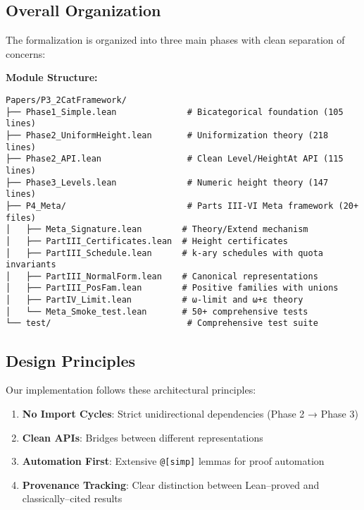 \documentclass[11pt]{article}
\theoremstyle{definition}
\theoremstyle{remark}
\begin{document}
\subsection{Overall Organization}

The formalization is organized into three main phases with clean separation of concerns:

\begin{mdframed}[style=technical]
\textbf{Module Structure:}
\begin{lstlisting}[language={}]
Papers/P3_2CatFramework/
├── Phase1_Simple.lean              # Bicategorical foundation (105 lines)
├── Phase2_UniformHeight.lean       # Uniformization theory (218 lines)
├── Phase2_API.lean                 # Clean Level/HeightAt API (115 lines)
├── Phase3_Levels.lean              # Numeric height theory (147 lines)
├── P4_Meta/                        # Parts III-VI Meta framework (20+ files)
│   ├── Meta_Signature.lean        # Theory/Extend mechanism
│   ├── PartIII_Certificates.lean  # Height certificates
│   ├── PartIII_Schedule.lean      # k-ary schedules with quota invariants
│   ├── PartIII_NormalForm.lean    # Canonical representations
│   ├── PartIII_PosFam.lean        # Positive families with unions
│   ├── PartIV_Limit.lean          # ω-limit and ω+ε theory
│   └── Meta_Smoke_test.lean       # 50+ comprehensive tests
└── test/                           # Comprehensive test suite
\end{lstlisting}
\end{mdframed}

\subsection{Design Principles}

Our implementation follows these architectural principles:

\begin{enumerate}
\item \textbf{No Import Cycles}: Strict unidirectional dependencies (Phase 2 → Phase 3)
\item \textbf{Clean APIs}: Bridges between different representations
\item \textbf{Automation First}: Extensive \texttt{@[simp]} lemmas for proof automation
\item \textbf{Provenance Tracking}: Clear distinction between Lean--proved and classically--cited results
\end{enumerate}

\end{document}
